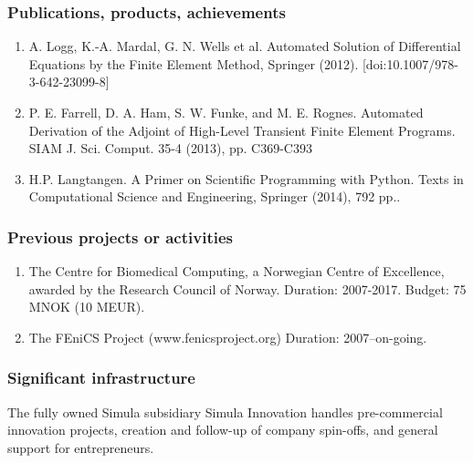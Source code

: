 \subsubsection*{Publications, products, achievements}

\begin{enumerate}
\item  A. Logg, K.-A. Mardal, G. N. Wells et al. Automated Solution of Differential Equations by the Finite Element Method, Springer (2012). [doi:10.1007/978-3-642-23099-8]
\item P. E. Farrell, D. A. Ham, S. W. Funke, and M. E. Rognes.	Automated Derivation of the Adjoint of High-Level Transient Finite Element Programs. SIAM J. Sci. Comput. 35-4 (2013), pp. C369-C393
\item H.P. Langtangen. A Primer on Scientific Programming with Python. Texts in Computational Science and Engineering, Springer (2014), 792 pp..
\end{enumerate}

\subsubsection*{Previous projects or activities}

\begin{enumerate}
\item The Centre for Biomedical Computing, a Norwegian Centre of Excellence, awarded by the Research Council of Norway. Duration: 2007-2017. Budget: 75 MNOK (10 MEUR). 
\item The FEniCS Project (www.fenicsproject.org) Duration: 2007--on-going. 
\end{enumerate}

\subsubsection*{Significant infrastructure}

The fully owned Simula subsidiary Simula Innovation handles pre-commercial innovation projects, creation and follow-up of company spin-offs, and general support for entrepreneurs.
